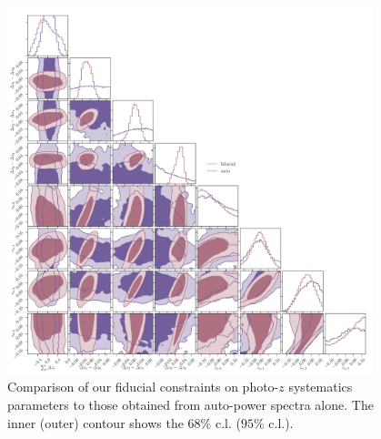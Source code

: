 \documentclass[a4paper,11pt]{article}
\begin{document}
      \begin{figure}
        \begin{center}
          \includegraphics[width=0.95\textwidth]{figures/contours-pz-syst_mPk=HOD_fix=alpha-fc-sigmaM_HOD=zevol_fit=pz-shifts+prior=0p2-pz-widths+prior=0p2_cosmo=const_cov=G+NG+SSC-LINBIAS_HOD-param=zfid_clfit=HOD-zevol_fit=auto+cross-vs-fit=auto.pdf}
          \caption{Comparison of our fiducial constraints on photo-$z$ systematics parameters to those obtained from auto-power spectra alone. The inner (outer) contour shows the $68 \%$ c.l. ($95 \%$ c.l.).}
          \label{fig:constraints-pz-syst-auto+cross-vs-auto}
        \end{center}
      \end{figure}
\end{document}
